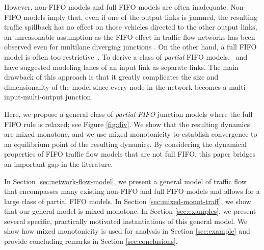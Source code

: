 \documentclass[letterpaper, 10 pt, conference]{ieeeconf}
\begin{document}
However, non-FIFO models and full FIFO models are often inadequate.  {Non-FIFO} models imply that, even if one of the output links is jammed, the resulting traffic spillback has no effect on those vehicles directed to the other output links, an unreasonable assumption as the FIFO effect in traffic flow networks has been observed even for multilane diverging junctions \cite{Cassidy2002563,Munoz:2002qv}. On the other hand, a full FIFO model is often too restrictive~\cite{wrightetal16a}. To derive a class of {\it partial} FIFO models,~\cite{bliemer07} and \cite{shiomi2015} have suggested modeling lanes of an input link as separate links. The main drawback of this approach is that it greatly complicates the size and dimensionality of the model since every node in the network becomes a multi-input-multi-output junction.


Here, we propose a general class of \emph{partial FIFO} junction models where the full FIFO rule is relaxed; see Figure \ref{fig:div}. We show that the resulting dynamics are mixed monotone, and we use mixed monotonicity to establish convergence to an equilibrium point of the resulting dynamics. By considering the dynamical properties of FIFO traffic flow models that are not full FIFO, this paper bridges an important gap in the literature.

In Section \ref{sec:network-flow-model}, we present a general model of traffic flow that encompasses many existing non-FIFO and full FIFO models and allows for a large class of partial FIFO models. In Section \ref{sec:mixed-monot-traff}, we show that our general model is mixed monotone. In Section \ref{sec:examples}, we present several specific, practically motivated instantiations of this general model. We show how mixed monotonicity is used for analysis in Section \ref{sec:example} and provide concluding remarks in Section \ref{sec:conclusions}.
\end{document}
